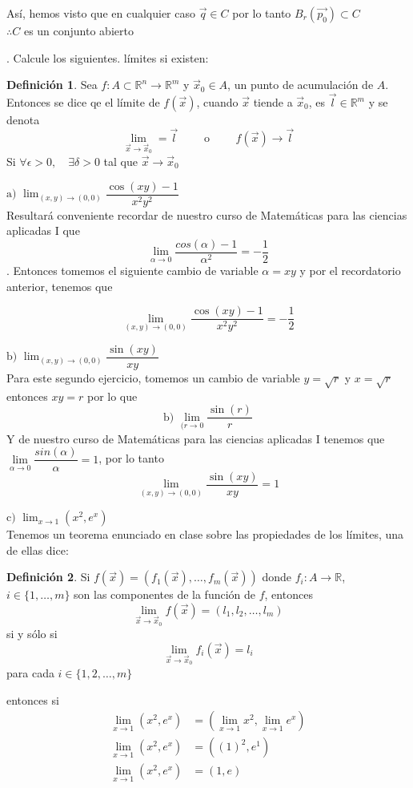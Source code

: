 \documentclass[letterpaper]{article}
\newcommand{\R}{\mathds{R}}
\renewcommand{\*}{\cdot}
\theoremstyle{definition}
\newtheorem{definition}{Definición}
\begin{document}
\begin{center}
	Así, hemos visto que en cualquier caso $ \vec{q} \in C $ por lo tanto $ B_r(\vec{p_0})  \subset C$\\
	$ \therefore C $ es un conjunto abierto
\end{center}


.  Calcule los siguientes. límites si existen: 
\begin{definition}
	Sea $ f: A \subset \R^n \to \R^m $ y $ \vec{x}_0 \in A $, un punto de acumulación de $ A $. Entonces se dice qe el límite de $  f(\vec{x}) $, cuando $ \vec{x} $ tiende a $ \vec{x}_0 $, es $ \vec{\textit{l}} \in \R^m $ y se denota
	\[ \lim\limits_{\vec{x} \to \vec{x}_0} = \vec{\textit{l}} \qquad \text{ o } \qquad f(\vec{x}) \to \vec{\textit{l}} \]
	Si $ \forall \epsilon > 0, \quad \exists  \delta > 0 $ tal que $ \vec{x} \to \vec{x}_0 $
\end{definition}


\noindent$\text{a) }\displaystyle\lim_{(x,y) \to (0,0)} \dfrac{\cos(xy) - 1}{x^2y^2}$\\
Resultará conveniente recordar de nuestro curso de Matemáticas para las ciencias aplicadas I que $$ \lim\limits_{\alpha \to 0} \dfrac{cos(\alpha) - 1}{\alpha^2} = -\dfrac{1}{2} $$.  
Entonces tomemos el siguiente cambio de variable $ \alpha = xy $
y por el recordatorio anterior, tenemos que 
 
$$\displaystyle\lim_{(x,y) \to (0,0)} \dfrac{\cos(xy) - 1}{x^2y^2} = -\dfrac{1}{2}$$

\noindent$\text{b) }\displaystyle\lim_{(x,y) \to (0,0)} \dfrac{\sin(xy) }{xy}$\\
Para este segundo ejercicio, tomemos un cambio de variable $ y =\sqrt{r}  $ y $ x = \sqrt{r} $ entonces $ xy = r $ por lo que
$$\text{b) }\displaystyle\lim_{(r\to 0} \dfrac{\sin(r) }{r}$$
Y de nuestro curso de Matemáticas para las ciencias aplicadas I tenemos que $ \lim\limits_{\alpha \to 0} \dfrac{sin(\alpha)}{\alpha} = 1 $, por lo tanto
$$\displaystyle\lim_{(x,y) \to (0,0)} \dfrac{\sin(xy) }{xy} = 1$$

$\text{c) }\displaystyle\lim_{x \to 1} (x^2 , e^x) $\\[0.5cm]
Tenemos un teorema enunciado en clase sobre las propiedades de los límites, una de ellas dice:
\begin{definition}
	Si $ f(\vec{x}) = (f_1(\vec{x}), \dots, f_m(\vec{x})) $ donde $ f_i:A \to \R  $, $ i \in \{ 1, \dots, m \} $  son las componentes de la función de $ f $, entonces 
	\[ \lim\limits_{\vec{x} \to \vec{x}_0 } f(\vec{x}) = (l_1, l_2, \dots, l_m) \] si y sólo si\[ \lim\limits_{\vec{x} \to \vec{x}_0} f_i(\vec{x}) = l_i \] para cada $ i \in \{ 1, 2, \dots, m \} $
\end{definition}
entonces si
\begin{align*}
	\lim_{x \to 1} (x^2 , e^x) &=\left( \lim_{x \to 1} x^2, \lim_{x \to 1} e^x \right)\\
	\lim_{x \to 1} (x^2 , e^x) &=\left( (1)^2,  e^{1} \right)\\
	\lim_{x \to 1} (x^2 , e^x) &=\left( 1,  e \right)\\
\end{align*}
\end{document}
